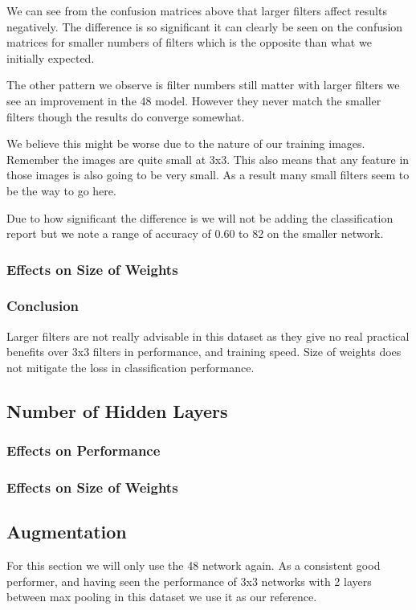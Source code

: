 We can see from the confusion matrices above that larger filters affect results negatively. The difference is so significant it can clearly be seen on the confusion matrices for smaller numbers of filters which is the opposite than what we initially expected.

The other pattern we observe is filter numbers still matter with larger filters we see an improvement in the 48 model. However they never match the smaller filters though the results do converge somewhat.

We believe this might be worse due to the nature of our training images. Remember the images are quite small at 3x3. This also means that any feature in those images is also going to be very small. As a result many small filters seem to be the way to go here.

Due to how significant the difference is we will not be adding the classification report but we note a range of accuracy of 0.60 to 82 on the smaller network.
\subsubsection{Effects on Size of Weights}

\subsubsection{Conclusion}
Larger filters are not really advisable in this dataset as they give no real practical benefits over 3x3 filters in performance, and training speed. Size of weights does not mitigate the loss in classification performance.

\subsection{Number of Hidden Layers}
\subsubsection{Effects on Performance}
\subsubsection{Effects on Size of Weights}

\subsection{Augmentation}
For this section we will only use the 48 network again. As a consistent good performer, and having seen the performance of 3x3 networks with 2 layers between max pooling in this dataset we use it as our reference.

